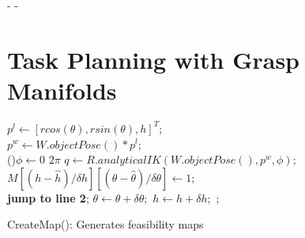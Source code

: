 \documentclass{aamas2015}
\begin{document}
%


\newpage
-
\newpage
-
\newpage
\section{Task Planning with Grasp Manifolds}

\begin{algorithm}[ht!]
   {
    \For{$\theta \leftarrow \hat{\theta}$ \KwTo $\check{\theta}$} {
      $p^l \leftarrow [r cos(\theta), r sin(\theta), h]^T;$ \\
      $p^w \leftarrow W.objectPose() * p^l$;  \\
      \For(){$\phi \leftarrow 0$ \KwTo $2 \pi$} {
	$q \leftarrow R.analyticalIK(W.objectPose(), p^w, \phi);$ \\
	 {
	  $M[(h-\hat{h})/\delta h][(\theta-\hat{\theta})/\delta \theta] \leftarrow 1;$ \\
	  \textbf{jump to line 2};
	}
      }
      $\theta \leftarrow \theta + \delta \theta;$
    }
    $h \leftarrow h + \delta h;$
  }
  ; 
  \caption{CreateMap(): Generates feasibility maps}
\end{algorithm}
\end{document}
